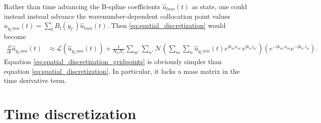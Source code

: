\documentclass[letterpaper,11pt,nointlimits,reqno,draft]{amsbook}
\newcommand{\ii}{\ensuremath{\mathrm{i}}}
\begin{document}
Rather than time advancing the B-spline coefficients $\hat{u}_{l m n}(t)$ as
state, one could instead instead advance the wavenumber-dependent collocation
point values $\hat{u}_{y_{l'} m n}(t) = \sum_{l} B_l\!\left(y_{l'}\right)
\hat{u}_{l m n}(t)$.  Then \eqref{eq:spatial_discretization} would become
\begin{align}
  \frac{\partial}{\partial{}t} \hat{u}_{y_{l'} m n}(t)
  &\approx
  \mathscr{L}\left(\hat{u}_{y_{l'} m n}(t)\right)
  +
  \frac{1}{N_x N_z}
  \sum_{m'} \sum_{n'}
  \mathscr{N}\left(
    \sum_{m}
    \sum_{n}
    \hat{u}_{y_{l'} m n}(t)
    e^{\ii k_m x_{m'}}e^{\ii k_n z_{n'}}
  \right)
  \left(
    e^{-\ii k_{m'} x_m}e^{-\ii k_{n'} z_n}
  \right)
  .
  \label{eq:spatial_discretization_gridpoints}
\end{align}
Equation \eqref{eq:spatial_discretization_gridpoints} is obviously simpler than
equation \eqref{eq:spatial_discretization}.  In particular, it lacks a mass
matrix in the time derivative term.

\section{Time discretization}
\label{sec:timediscretization}
\end{document}
